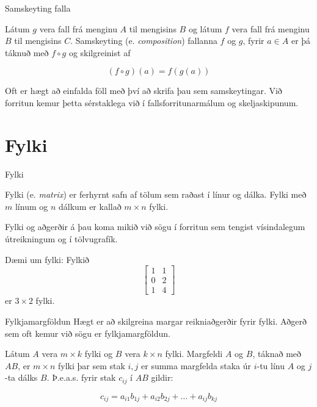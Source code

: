 \documentclass[handout]{beamer}
\begin{document}
\begin{frame}{Samskeyting falla}
\begin{tcolorbox}[title=Samskeyting falla]
Látum $g$ vera fall frá menginu $A$ til mengisins $B$ og látum $f$ vera fall frá menginu $B$ til mengisins $C$. Samskeyting (e. \emph{composition}) fallanna $f$ og $g$, fyrir $a \in A$ er þá táknuð með $f \circ g$ og skilgreinist af

\[
 (f \circ g)(a) = f(g(a))
\]

\end{tcolorbox}
Oft er hægt að einfalda föll með því að skrifa þau sem samskeytingar. Við forritun kemur þetta sérstaklega við í fallsforritunarmálum og skeljaskipunum.
\end{frame}

\section{Fylki}

\begin{frame}{Fylki}
\begin{tcolorbox}[title=Fylki]
Fylki (e. \emph{matrix}) er ferhyrnt safn af tölum sem raðast í línur og dálka. Fylki með $m$ línum og $n$ dálkum er kallað $m \times n$ fylki.
\end{tcolorbox}
Fylki og aðgerðir á þau koma mikið við sögu í forritun sem tengist vísindalegum útreikningum og í tölvugrafík.

Dæmi um fylki: Fylkið
\[
\begin{bmatrix}
1&1\\0&2\\1&4
\end{bmatrix}
\]
er $3 \times 2$ fylki.
\end{frame}

\begin{frame}{Fylkjamargföldun}
Hægt er að skilgreina margar reikniaðgerðir fyrir fylki. Aðgerð sem oft kemur við sögu er fylkjamargföldun.

\begin{tcolorbox}[title=Fylkjamargföldun]
Látum $A$ vera $m \times k$ fylki og $B$ vera $k \times n$ fylki. Margfeldi $A$ og $B$, táknað með $AB$, er $m \times n$ fylki þar sem stak $i, j$ er summa margfelda staka úr $i$-tu línu $A$ og $j$-ta dálks $B$. Þ.e.a.s. fyrir stak $c_{ij}$ í $AB$ gildir:

\[
 c_{ij} = a_{i1}b_{1j} + a_{i2}b_{2j} + \ldots + a_{ij}b_{kj}
\]
\end{tcolorbox}
\end{frame}
\end{document}
